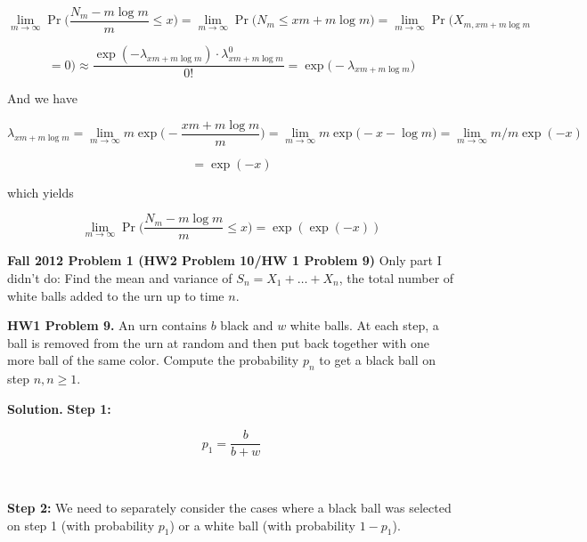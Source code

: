 \begin{enumerate}[(a)]
\[
\lim_{m \to \infty} \Pr \bigg( \frac{N_m - m \log m}{m} \leq x \bigg) = \lim_{m \to \infty} \Pr \big( N_m \leq xm + m \log    m\big) = \lim_{m \to \infty} \Pr \big( X_{m, {xm + m \log    m}} 
\]

\[
= 0) \approx \frac{\exp(-\lambda_ {xm + m \log    m}) \cdot \lambda_ {xm + m \log    m}^0}{0!} = \exp \big(-\lambda_ {xm + m \log    m} \big)
\]



And we have

\[
\lambda_ {xm + m \log    m} = \lim_{m \to \infty} m \exp \bigg(-\frac{xm + m \log    m}{m} \bigg) = \lim_{m \to \infty} m \exp \big(-x -  \log    m\big)   = \lim_{m \to \infty} m/m \exp (-x ) 
\]



\[
 = \exp(-x)
\]

which yields

\[
\boxed{
\lim_{m \to \infty} \Pr \bigg( \frac{N_m - m \log m}{m} \leq x \bigg)  = \exp( \exp(-x))}
\]






\end{enumerate}


\textbf{Fall 2012 Problem 1 (HW2 Problem 10/HW 1 Problem 9)} Only part I didn't do: Find the mean and variance of \(S_n = X_1 + \ldots + X_n\), the total number of white balls added to the urn up to time \(n\).

\textbf{HW1 Problem 9.} An urn contains \(b\) black and \(w\) white balls. At each step, a ball is removed from the urn at random and then put back together with one more ball of the same color. Compute the probability \(p_n\) to get a black ball on step \(n, n \geq 1\).

\textbf{Solution.} \textbf{Step 1:}

\[
p_1 = \frac{b}{b+w}
\]

\

\textbf{Step 2:} We need to separately consider the cases where a black ball was selected on step 1 (with probability \(p_1\)) or a white ball (with probability \(1 - p_1\)).

